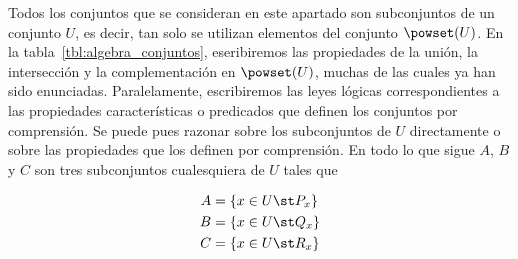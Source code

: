 



Todos los conjuntos que se consideran en este apartado son subconjuntos de
un conjunto $U$, es decir, tan solo se utilizan elementos del conjunto
$\powset(U)$. En la tabla~\ref{tbl:algebra_conjuntos}, eseribiremos las
propiedades de la unión, la intersección y la complementación en
$\powset(U)$, muchas de las cuales ya han sido enunciadas. Paralelamente,
escribiremos las leyes lógicas correspondientes a las propiedades
características o predicados que definen los conjuntos por comprensión. Se
puede pues razonar sobre los subconjuntos de $U$ directamente o sobre las
propiedades que los definen por comprensión. En todo lo que sigue $A$, $B$ y
$C$ son tres subconjuntos cualesquiera de $U$ tales que

\begin{align*}
  A &= \{x \in U \st P_x\} \\
  B &= \{x \in U \st Q_x\} \\
  C &= \{x \in U \st R_x\} \\
\end{align*}


